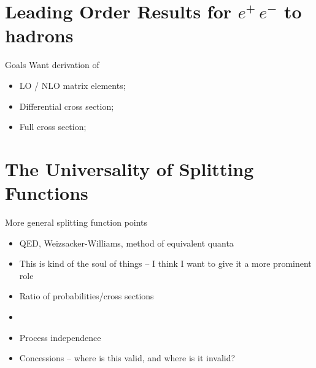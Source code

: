 \begin{subappendices}


\section{Leading Order Results for \texorpdfstring{\(e^+\,e^-\)}{electron-positron} to hadrons}

\begin{sambox}{Goals}{}
    Want derivation of
    \begin{itemize}
        \item
            LO / NLO matrix elements;

        \item
            Differential cross section;

        \item
            Full cross section;
    \end{itemize}
\end{sambox}


\section{The Universality of Splitting Functions}

\begin{sambox}{More general splitting function points}{}
    \begin{itemize}
        \item
            QED, Weizs\:acker-Williams, method of equivalent quanta

        \item
            This is kind of the soul of things -- I think I want to give it a more prominent role

        \item
            Ratio of probabilities/cross sections

        \item

        \item
            Process independence

        \item
            Concessions -- where is this valid, and where is it invalid?
    \end{itemize}
\end{sambox}


\end{subappendices}

